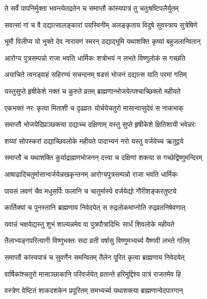 \twolineshloka
{ते सर्वे पापनिर्मुक्ता भवन्त्येतद्रतेन च}
{समाप्तौ कांस्यपात्रं तु चतुःषष्टिपलैर्युतम्} %

\twolineshloka
{सवत्सां गां च वै दद्यात्सालङ्कारां पयस्विनीम्}
{अलङ्कृताय विदुषे सुवस्त्राय सुत्रेषिणे} %

\twolineshloka
{भूमौ विलीप्य यो भुक्ते देव नारायणं स्मरन्}
{दद्याद्भूमि यथाशक्ति कृष्यां बहुजलान्वितान्} %

\twolineshloka
{आरोग्य पुत्रसम्पन्नो राजा भवति धार्मिकः}
{शत्रोभयं न लभते विष्णुलोकं स गच्छति} %

\twolineshloka
{अयाचिते त्वनड्वाहं सहिरण्यं सचन्दनम्}
{षडसं भोजनं दद्यात्स याति परमां गतिम्} %

\twolineshloka
{यस्तुसुप्ते हृषीकेशे नक्तं च कुरुते व्रतम्}
{ब्राह्मणान्भोजयेत्पश्चाच्छिक्लो महीयते} %

\twolineshloka
{एकभक्तं नरः कृत्वा मिताशी च दृढव्रतः}
{योर्चयेचतुरो मासान्वासुदेवं स नाकभाक्} %

\twolineshloka
{समाप्तौ भोजयेदिप्राञ्छक्त्या दद्याच्च दक्षिणाम्}
{यस्तु सुप्ते हृषीकेशे क्षितिशायी भवेन्नरः} %

\twolineshloka
{शय्यां सोपस्करां दद्याच्छिवलोके महीयते}
{पादाभ्यनं नरो यस्तु वर्जयेच्च ऋतुद्वये} %

\twolineshloka
{समाप्तौ च यथाशक्ति कुर्याद्राह्मणभोजनन्}
{दत्त्वा च दक्षिणां शक्त्या स गच्छेद्विष्णुमन्दिरम्} %

\twolineshloka
{आषाढादिचतुर्मासान्वर्जयेन्नखकृन्तनम्}
{आरोग्यपुत्रसम्पन्नो राजा भवति धार्मिकः} %

\twolineshloka
{पायसं लवणं चैव मधुसर्पिः फलानि च}
{चातुर्मास्ये वर्जयेद्यो गौरीशङ्करतुष्टये} %

\twolineshloka
{कार्तिक्यां च पुनस्तानि ब्राह्मणाय निवेदयेत्}
{स रुद्रलोकमाप्नोति रुद्रव्रतनिषेवणात्} %

\twolineshloka
{यवान्नं भक्षयेद्यस्तु शुभं शाल्यन्नमेव वा}
{पुत्रपौत्रादिभिः सार्धं शिवलोके महीयते} %

\twolineshloka
{तैलाभ्यङ्गपरित्यागी विष्णुभक्तः सदा व्रती}
{वर्षासु विष्णुमभ्यर्च्य वैष्णवी लभते गतिम्} %

\twolineshloka
{समाप्तौ कांस्यपात्रं च सुवर्णेन समन्वितम्}
{तैलेन पूरितं कृत्वा ब्राह्मणाय निवेदयेत्} %

\twolineshloka
{वार्षिकांश्चतुरो मासाञ्छाकानि परिवर्जयेत्}
{व्रतान्ते हरिमुद्दिश्य पात्रं राजतमेव हि} %

\twolineshloka
{वस्त्रेण वेष्टितं शाकदशकेन प्रपूरितम्}
{समभ्यर्च्य यथाशक्त्या ब्राह्मणान्वेदपारगान्} %

